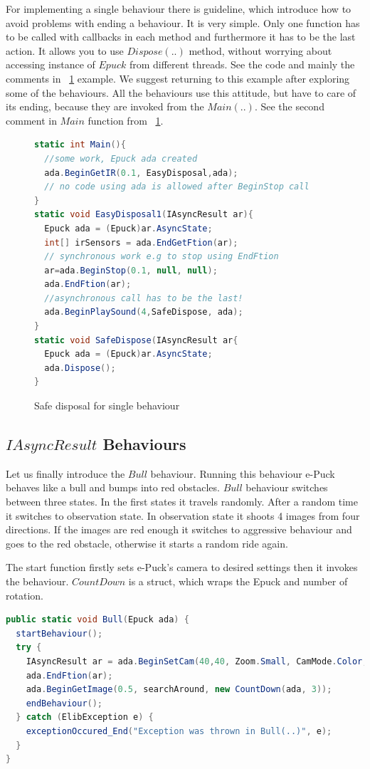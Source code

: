   For implementing a single behaviour there is guideline, which introduce how to avoid problems with ending a behaviour.
  It is very simple. Only one function has to be called  with callbacks in each method and 
  furthermore it has to be the last action. It allows you to use $Dispose(..)$ method, 
  without worrying about accessing instance of $Epuck$  from different threads.
  See the code and mainly the comments in ~\ref{safedis} example. 
  We suggest returning to this example after exploring some of the behaviours.
  All the behaviours use this attitude, but have to care of its ending, because they are invoked from the $Main(..)$. 
  See the second comment in $Main$ function from ~\ref{safedis}.
\begin{figure}[!hbp]	
\begin{lstlisting}[language=cs]
static int Main(){
  //some work, Epuck ada created
  ada.BeginGetIR(0.1, EasyDisposal,ada);
  // no code using ada is allowed after BeginStop call
}
static void EasyDisposal1(IAsyncResult ar){
  Epuck ada = (Epuck)ar.AsyncState;
  int[] irSensors = ada.EndGetFtion(ar);
  // synchronous work e.g to stop using EndFtion
  ar=ada.BeginStop(0.1, null, null);
  ada.EndFtion(ar);
  //asynchronous call has to be the last!
  ada.BeginPlaySound(4,SafeDispose, ada);
}
static void SafeDispose(IAsyncResult ar{
  Epuck ada = (Epuck)ar.AsyncState;
  ada.Dispose();
}
\end{lstlisting}
\caption{Safe disposal for single behaviour} \label{safedis}
\end{figure}

\subsection{$IAsyncResult$ Behaviours}\label{sec:iabehaviors}\label{sec:bull}
  Let us finally introduce the $Bull$ behaviour.
  Running this behaviour e-Puck behaves like a bull and bumps into red obstacles.
  $Bull$ behaviour switches between three states. In the first states it travels randomly. 
  After a random time it switches to observation state.
  In observation state it shoots 4 images from four directions. If the images are red enough 
  it switches to aggressive behaviour and goes to the red obstacle,
  otherwise it starts a random ride again.

  
  The start function firstly sets e-Puck's camera to desired settings then it invokes the behaviour.
  $CountDown$ is a struct, which wraps the Epuck and number of rotation.

\begin{lstlisting}[language=cs]
public static void Bull(Epuck ada) {
  startBehaviour();
  try {
    IAsyncResult ar = ada.BeginSetCam(40,40, Zoom.Small, CamMode.Color, toSetCam, null, null);
    ada.EndFtion(ar);
    ada.BeginGetImage(0.5, searchAround, new CountDown(ada, 3));
    endBehaviour();
  } catch (ElibException e) {
    exceptionOccured_End("Exception was thrown in Bull(..)", e);
  }
}
\end{lstlisting}
  
